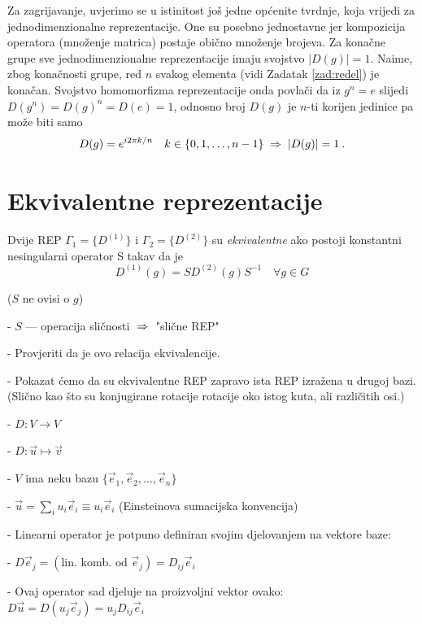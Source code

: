 Za zagrijavanje, uvjerimo se u istinitost još jedne općenite tvrdnje,
koja vrijedi za jednodimenzionalne reprezentacije.
One su posebno jednostavne jer
 kompozicija operatora (množenje matrica) postaje obično množenje
 brojeva.
Za konačne grupe sve jednodimenzionalne reprezentacije imaju svojstvo $|D(g)|=1$.
Naime, zbog konačnosti grupe, red $n$ svakog elementa 
(vidi Zadatak \ref{zad:redel}) je konačan. Svojstvo homomorfizma
reprezentacije onda povlači da iz $g^n=e$ slijedi $D(g^n)=
  D(g)^n=D(e)=1$, odnosno broj $D(g)$ je $n$-ti korijen jedinice pa može
  biti samo
\begin{equation*}
 D(g)= e^{i 2\pi k/n} \quad k\in\{0,1,\ldots, n-1\} \;\Rightarrow\; |D(g)|=1 \:.
\end{equation*}

\section{Ekvivalentne reprezentacije}

\begin{definicija}
Dvije REP $\Gamma_{1}=\{D^{(1)}\}$ i $\Gamma_{2}=\{D^{(2)}\}$ su
\emph{ekvivalentne} ako postoji konstantni nesingularni operator
S takav da je
\begin{displaymath}
        D^{(1)}(g) = S D^{(2)}(g) S^{-1} \quad \forall g \in G
\end{displaymath}
\end{definicija}
($S$ ne ovisi o $g$)

- $S$ --- operacija sličnosti $\;\Rightarrow\;$ "slične REP"

- Provjeriti da je ovo relacija ekvivalencije.

- Pokazat ćemo da su ekvivalentne REP zapravo ista REP izražena
  u drugoj bazi. (Slično kao što su konjugirane rotacije rotacije
  oko istog kuta, ali različitih osi.)

- $D:V \to V$

- $D:\vec{u}\mapsto \vec{v}$

- $V$ ima neku bazu $\{\vec{e}_1, \vec{e}_2, \ldots, \vec{e}_n\}\quad$

- $\vec{u} = \sum_{i} u_i \vec{e}_i \equiv u_i \vec{e}_i$
  \hfill (Einsteinova sumacijska konvencija)

- Linearni operator je potpuno definiran svojim djelovanjem na
  vektore baze:

- $D \vec{e}_j = (\textrm{lin. komb. od } \vec{e}_j) = D_{ij}
  \vec{e}_i$

- Ovaj operator sad djeluje na proizvoljni vektor ovako:\\
  $D\vec{u}=D( u_j \vec{e}_j)= u_j D_{ij} \vec{e}_i$

